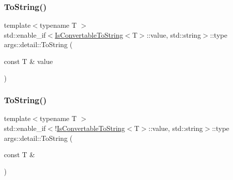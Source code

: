 \subsubsection{\texorpdfstring{To\+String()}{ToString()}\hspace{0.1cm}{\footnotesize\ttfamily [1/2]}}
{\footnotesize\ttfamily template$<$typename T $>$ \\
std\+::enable\+\_\+if$<$\hyperlink{structargs_1_1detail_1_1_is_convertable_to_string}{Is\+Convertable\+To\+String}$<$T$>$\+::value, std\+::string$>$\+::type args\+::detail\+::\+To\+String (\begin{DoxyParamCaption}\item[{const T \&}]{value }\end{DoxyParamCaption})}

\mbox{\label{namespaceargs_1_1detail_a4927ff5ca5c046d660c05fff3c7f3f1d}} 
\subsubsection{\texorpdfstring{To\+String()}{ToString()}\hspace{0.1cm}{\footnotesize\ttfamily [2/2]}}
{\footnotesize\ttfamily template$<$typename T $>$ \\
std\+::enable\+\_\+if$<$!\hyperlink{structargs_1_1detail_1_1_is_convertable_to_string}{Is\+Convertable\+To\+String}$<$T$>$\+::value, std\+::string$>$\+::type args\+::detail\+::\+To\+String (\begin{DoxyParamCaption}\item[{const T \&}]{ }\end{DoxyParamCaption})}

